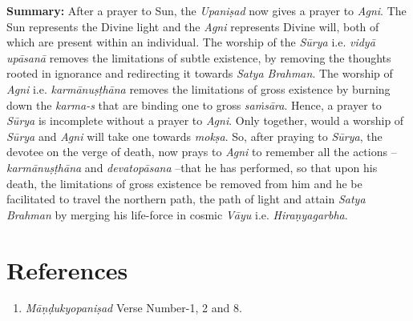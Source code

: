 \textbf{Summary:} After a prayer to Sun, the \emph{Upaniṣad} now gives a prayer to \emph{Agni}. The Sun represents the Divine light and the \emph{Agni} represents Divine will, both of which are present within an individual. The worship of the \emph{Sūrya} i.e. \emph{vidyā upāsanā} removes the limitations of subtle existence, by removing the thoughts rooted in ignorance and redirecting it towards \emph{Satya Brahman}. The worship of \emph{Agni} i.e. \emph{karmānuṣṭhāna} removes the limitations of gross existence by burning down the \emph{karma-s} that are binding one to gross \emph{saṁsāra}. Hence, a prayer to \emph{Sūrya} is incomplete without a prayer to \emph{Agni}. Only together, would a worship of \emph{Sūrya} and \emph{Agni} will take one towards \emph{mokṣa}. So, after praying to \emph{Sūrya}, the devotee on the verge of death, now prays to \emph{Agni} to remember all the actions -- \emph{karmānuṣṭhāna} and \emph{devatopāsana} --that he has performed, so that upon his death, the limitations of gross existence be removed from him and he be facilitated to travel the northern path, the path of light and attain \emph{Satya Brahman} by merging his life-force in cosmic \emph{Vāyu} i.e. \emph{Hiraṇyagarbha}.

\section*{References}

\begin{enumerate}
\itemsep=0pt
\item
  \emph{Māṇḍukyopaniṣad} Verse Number-1, 2 and 8.
\end{enumerate}


